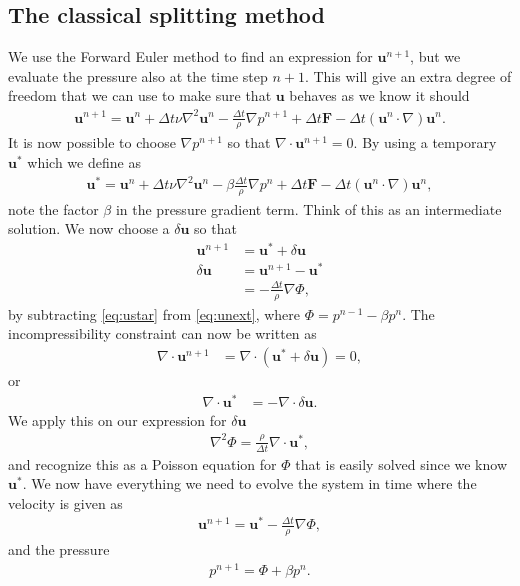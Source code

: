 \documentclass[a4paper,10pt]{article}
\renewcommand{\vec}[1]{\mathbf{#1}}
\renewcommand{\(}{\left(}
\renewcommand{\)}{\right)}
\begin{document}
\subsection{The classical splitting method}
We use the Forward Euler method to find an expression for $\vec u^{n+1}$, but we evaluate the pressure also at the time step $n+1$. This will give an extra degree of freedom that we can use to make sure that $\vec u$ behaves as we know it should
\begin{align}
  \label{eq:unext}
  \vec u^{n+1} = \vec u^{n} + \Delta t\nu\nabla^2\vec u^n - \frac{\Delta t}{\rho}\nabla p^{n+1} + \Delta t\vec F - \Delta t(\vec u^n\cdot \nabla)\vec u^n.
\end{align}
It is now possible to choose $\nabla p^{n+1}$ so that $\nabla \cdot \vec u^{n+1} = 0$. By using a temporary $\vec u^*$ which we define as
\begin{align}
  \label{eq:ustar}
  \vec u^* = \vec u^{n} + \Delta t\nu\nabla^2\vec u^n - \beta\frac{\Delta t}{\rho}\nabla p^n + \Delta t\vec F - \Delta t(\vec u^n\cdot \nabla)\vec u^n,
\end{align}
note the factor $\beta$ in the pressure gradient term. Think of this as an intermediate solution. We now choose a $\delta \vec u$ so that
\begin{align*}
  \vec u^{n+1} &= \vec u^* + \delta \vec u\\
  \delta \vec u &= \vec u^{n+1} - \vec u^*\\
  &= -\frac{\Delta t}{\rho}\nabla \Phi,
\end{align*}
by subtracting \eqref{eq:ustar} from \eqref{eq:unext}, where $\Phi = p^{n-1} - \beta p^n$. The incompressibility constraint can now be written as
\begin{align*}
  \nabla \cdot \vec u^{n+1} &= \nabla\cdot(\vec u^* + \delta \vec u) = 0,
\end{align*}
or
\begin{align*}
  \nabla \cdot \vec u^* &= -\nabla \cdot\delta \vec u.
\end{align*}
We apply this on our expression for $\delta \vec u$
\begin{align*}
  \nabla^2 \Phi = \frac{\rho}{\Delta t}\nabla \cdot \vec u^*,
\end{align*}
and recognize this as a Poisson equation for $\Phi$ that is easily solved since we know $\vec u^*$. We now have everything we need to evolve the system in time where the velocity is given as
\begin{align}
  \label{eq:u_next}
  \vec u^{n+1} = \vec u^* - \frac{\Delta t}{\rho}\nabla \Phi,
\end{align}
and the pressure
\begin{align}
  \label{eq:p_next}
  p^{n+1} = \Phi + \beta p^n.
\end{align}
\end{document}

